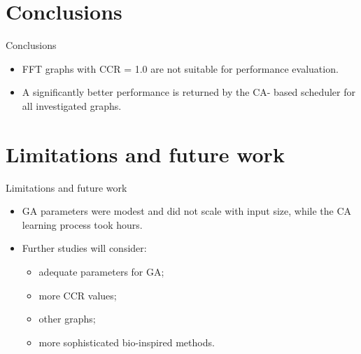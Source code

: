 \documentclass{beamer}
\begin{document}
\section{Conclusions}
\begin{frame}{Conclusions}
\begin{itemize}
\item FFT graphs with CCR = 1.0 are not suitable for performance evaluation.
\item A significantly better performance is returned by the CA-
based scheduler for all investigated graphs.
\end{itemize}
\end{frame}

\section{Limitations and future work}
\begin{frame}{Limitations and future work}
\begin{itemize}
\item GA parameters were modest and did not scale with input size, while the CA learning process took hours.
\item Further studies will consider:
	\begin{itemize}
	\item adequate parameters for GA;
    \item more CCR values;
    \item other graphs;
    \item more sophisticated bio-inspired methods.
	\end{itemize}
\end{itemize}
\end{frame}
\end{document}
